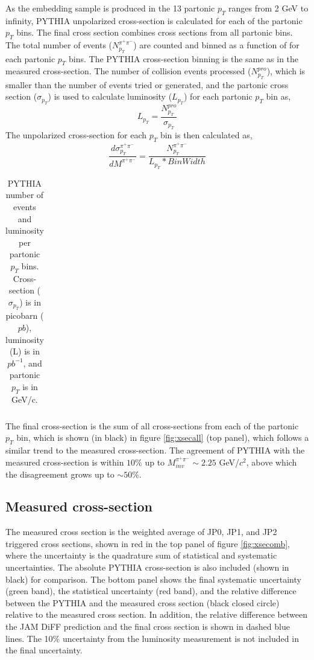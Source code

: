  As the embedding sample is produced in the 13 partonic $p_T$ ranges from 2 GeV to infinity, PYTHIA unpolarized \dipion cross-section is calculated for each of the partonic $p_T$ bins. The final cross section combines cross sections from all partonic bins. The total number of \dipion events ($N_{p_T}^{\pi^+\pi^-}$) are counted and binned as a function of \mpair for each partonic $p_T$ bins. The PYTHIA cross-section binning is the same as in the measured cross-section. The number of collision events processed ($N_{p_T}^{pro}$), which is smaller than the number of events tried or generated, and the partonic cross section ($\sigma_{p_T}$) is used to calculate luminosity ($L_{p_T}$) for each partonic $p_T$ bin as,
\begin{equation}
    L_{p_T} = \frac{N_{p_T}^{pro}}{\sigma_{p_T}}
\end{equation} 
The unpolarized \dipion cross-section for each $p_T$ bin is then calculated as, 
\begin{equation}
    \frac{d\sigma_{p_T}^{\pi^+\pi^-}}{dM^{\pi^+\pi^-}}= \frac{N_{p_T}^{\pi^+\pi^-}}{L_{p_T}*BinWidth}
\end{equation}

\begin{table}
    \centering
    \begin{tabular}{cccccccc}
     \hline \hline
      
    \end{tabular}
    \caption{PYTHIA number of events and luminosity per partonic $p_T$ bins. Cross-section ($\sigma_{p_T}$) is in picobarn ($pb$), luminosity (L) is in $pb^{-1}$, and partonic $p_T$ is in GeV/c. }
    \label{tab:pyth_num}
\end{table}

 The final cross-section is the sum of all cross-sections from each of the partonic $p_T$ bin, which is shown (in black) in figure \ref{fig:xsecall} (top panel), which follows a similar trend to the measured cross-section. The agreement of PYTHIA with the measured cross-section is within $10\%$ up to $M_{inv}^{\pi^+\pi^-}\sim 2.25$ GeV/$c^2$, above which the disagreement grows up to $\sim 50\%$.

\subsection{{Measured cross-section}}
The measured cross section is the weighted average of JP0, JP1, and JP2 triggered cross sections, shown in red in the top panel of figure \ref{fig:xsecomb}, where the uncertainty is the quadrature sum of statistical and systematic uncertainties. The absolute PYTHIA cross-section is also included (shown in black) for comparison. The bottom panel shows the final systematic uncertainty (green band), the statistical uncertainty (red band), and the relative difference between the PYTHIA and the measured cross section (black closed circle) relative to the measured cross section. In addition, the relative difference between the JAM DiFF prediction  and the final cross section is shown in dashed blue lines. The 10\% uncertainty from the luminosity measurement is not included in the final uncertainty.   

